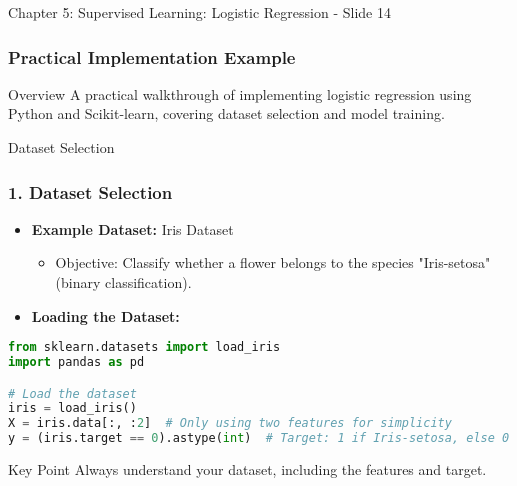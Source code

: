 \documentclass[aspectratio=169]{beamer}
\begin{document}
\begin{frame}{Chapter 5: Supervised Learning: Logistic Regression - Slide 14}
    \frametitle{Practical Implementation Example}
    \begin{block}{Overview}
        A practical walkthrough of implementing logistic regression using Python and Scikit-learn, covering dataset selection and model training.
    \end{block}
\end{frame}

\begin{frame}{Dataset Selection}
    \frametitle{1. Dataset Selection}
    \begin{itemize}
        \item \textbf{Example Dataset:} Iris Dataset
            \begin{itemize}
                \item Objective: Classify whether a flower belongs to the species "Iris-setosa" (binary classification).
            \end{itemize}
        \item \textbf{Loading the Dataset:}
    \end{itemize}
    \begin{lstlisting}[language=Python]
from sklearn.datasets import load_iris
import pandas as pd

# Load the dataset
iris = load_iris()
X = iris.data[:, :2]  # Only using two features for simplicity
y = (iris.target == 0).astype(int)  # Target: 1 if Iris-setosa, else 0
    \end{lstlisting}
    \begin{block}{Key Point}
        Always understand your dataset, including the features and target.
    \end{block}
\end{frame}
\end{document}
